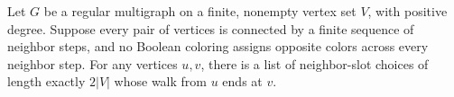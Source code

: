 \begin{theorem}
\label{Randomized.RegularMultigraph.exists_endpoint_eq_two_mul}
\leanok
{}
Let $G$ be a regular multigraph on a finite, nonempty vertex set $V$, with positive
degree. Suppose every pair of vertices is connected by a finite sequence of neighbor
steps, and no Boolean coloring assigns opposite colors across every neighbor step. For
any vertices $u,v$, there is a list of neighbor-slot choices of length exactly $2|V|$
whose walk from $u$ ends at $v$.
\end{theorem}
